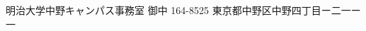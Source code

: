 \documentclass[]{jletteraddress}
\begin{document}
\addaddress
{明治大学中野キャンパス事務室}
{御中}
{164-8525}
{東京都中野区中野四丁目ー二一ー一}{}



\end{document}
